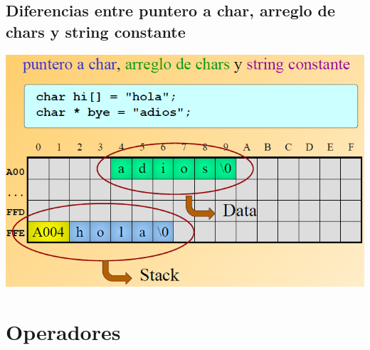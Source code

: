 \documentclass{article}
\begin{document}
\subsection{Diferencias entre puntero a char, arreglo de chars y string constante}
\begin{center}
    \includegraphics[width=.60\textwidth]{distintosTiposPunteros.PNG}
\end{center}
\newpage
\section{Operadores}
\end{document}
